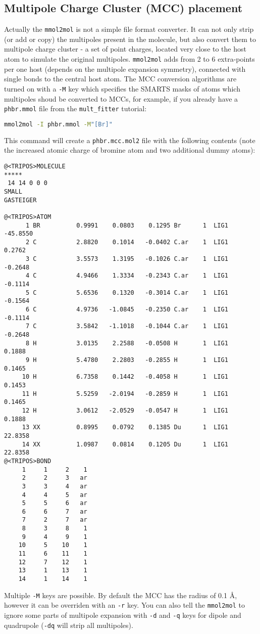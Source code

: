 \documentclass[10pt,a4paper]{article}
\begin{document}
\subsection{Multipole Charge Cluster (MCC) placement}
Actually the \lstinline{mmol2mol} is not a simple file format converter. It can not only 
strip (or add or copy) the multipoles present in the molecule, but also convert them to multipole charge 
cluster - a set of point charges, located very close to the host atom to simulate the original
multipoles. 
\lstinline{mmol2mol} adds from 2 to 6 extra-points per one host (depends on the multipole 
expansion symmetry), connected with single bonds to the central host atom. The MCC conversion
algorithms are turned on with a \lstinline{-M} key which specifies the SMARTS masks of atoms
which multipoles shoud be converted to MCCs, for example, if you already have a 
\lstinline{phbr.mmol} file from the \lstinline{mult_fitter} tutorial:
\begin{lstlisting}[language=bash]
mmol2mol -I phbr.mmol -M"[Br]" 
\end{lstlisting}
This command will create a \lstinline{phbr.mcc.mol2} file with the following contents
(note the increased atomic charge of bromine atom and two additional dummy atoms):
\begin{lstlisting}[style=file]
@<TRIPOS>MOLECULE
*****
 14 14 0 0 0
SMALL
GASTEIGER

@<TRIPOS>ATOM
      1 BR          0.9991    0.0803    0.1295 Br      1  LIG1      -45.8550
      2 C           2.8820    0.1014   -0.0402 C.ar    1  LIG1        0.2762
      3 C           3.5573    1.3195   -0.1026 C.ar    1  LIG1       -0.2648
      4 C           4.9466    1.3334   -0.2343 C.ar    1  LIG1       -0.1114
      5 C           5.6536    0.1320   -0.3014 C.ar    1  LIG1       -0.1564
      6 C           4.9736   -1.0845   -0.2350 C.ar    1  LIG1       -0.1114
      7 C           3.5842   -1.1018   -0.1044 C.ar    1  LIG1       -0.2648
      8 H           3.0135    2.2588   -0.0508 H       1  LIG1        0.1888
      9 H           5.4780    2.2803   -0.2855 H       1  LIG1        0.1465
     10 H           6.7358    0.1442   -0.4058 H       1  LIG1        0.1453
     11 H           5.5259   -2.0194   -0.2859 H       1  LIG1        0.1465
     12 H           3.0612   -2.0529   -0.0547 H       1  LIG1        0.1888
     13 XX          0.8995    0.0792    0.1385 Du      1  LIG1       22.8358
     14 XX          1.0987    0.0814    0.1205 Du      1  LIG1       22.8358
@<TRIPOS>BOND
     1     1     2    1
     2     2     3   ar
     3     3     4   ar
     4     4     5   ar
     5     5     6   ar
     6     6     7   ar
     7     2     7   ar
     8     3     8    1
     9     4     9    1
    10     5    10    1
    11     6    11    1
    12     7    12    1
    13     1    13    1
    14     1    14    1
\end{lstlisting}
Multiple \lstinline{-M} keys are possible. By default the MCC has the radius 
of 0.1 \AA, however it can be overriden with an 
\lstinline{-r} key. You can also tell the \lstinline{mmol2mol} to ignore some parts 
of multipole expansion with \lstinline{-d} and \lstinline{-q} keys for dipole and 
quadrupole (\lstinline{-dq} will strip all multipoles).
\end{document}
